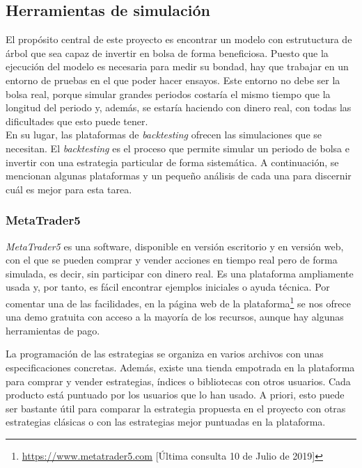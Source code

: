 
	\subsection{Herramientas de simulaci\'on}		
	El prop\'osito central de este proyecto es encontrar un modelo con estrutuctura de \'arbol que sea capaz de invertir en bolsa de forma beneficiosa. Puesto que la ejecuci\'on del modelo es necesaria para medir su bondad, hay que trabajar en un entorno de pruebas en el que poder hacer ensayos. Este entorno no debe ser la bolsa real, porque simular grandes periodos costar\'ia el mismo tiempo que la longitud del periodo y, adem\'as, se estar\'ia haciendo con dinero real, con todas las dificultades que esto puede tener.\\
	
	En su lugar, las plataformas de \textit{backtesting} ofrecen las simulaciones que se necesitan. El \textit{backtesting} es el proceso que permite simular un periodo de bolsa e invertir con una estrategia particular de forma sistem\'atica. A continuaci\'on, se mencionan algunas plataformas y un peque\~no an\'alisis de cada una para discernir cu\'al es mejor para esta tarea. 
	
	
		\subsubsection{MetaTrader5}
		
    	\textit{MetaTrader5} es una software, disponible en versi\'on escritorio y en versi\'on web, con el que se pueden comprar y vender acciones en tiempo real pero de forma simulada, es decir, sin participar con dinero real. Es una plataforma ampliamente usada y, por tanto, es f\'acil encontrar ejemplos iniciales o ayuda t\'ecnica. Por comentar una de las facilidades, en la p\'agina web de la plataforma\footnote{\url{https://www.metatrader5.com} [\'Ultima consulta 10 de Julio de 2019]} se nos ofrece una demo gratuita con acceso a la mayor\'ia de los recursos, aunque hay algunas herramientas de pago.
		
		La programaci\'on de las estrategias se organiza en varios archivos con unas especificaciones concretas. Adem\'as, existe una tienda empotrada en la plataforma para comprar y vender estrategias, \'indices o bibliotecas con otros usuarios. Cada producto est\'a puntuado por los usuarios que lo han usado. A priori, esto puede ser bastante \'util para comparar la estrategia propuesta en el proyecto con otras estrategias cl\'asicas o con las estrategias mejor puntuadas en la plataforma.\\
		
